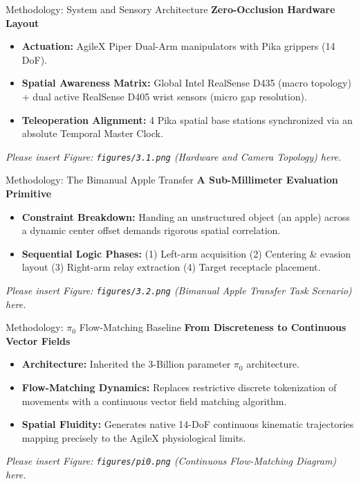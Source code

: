 \documentclass[aspectratio=169, t]{beamer}
\begin{document}
\begin{frame}{Methodology: System and Sensory Architecture}
    {\Large \textbf{Zero-Occlusion Hardware Layout}}
    \vspace{0.5cm}
    \begin{itemize}
        \item \textbf{Actuation:} AgileX Piper Dual-Arm manipulators with Pika grippers (14 DoF). 
        \item \textbf{Spatial Awareness Matrix:} Global Intel RealSense D435 (macro topology) + dual active RealSense D405 wrist sensors (micro gap resolution).
        \item \textbf{Teleoperation Alignment:} 4 Pika spatial base stations synchronized via an absolute Temporal Master Clock.
    \end{itemize}
    \vfill
    \textit{Please insert Figure: \texttt{figures/3.1.png} (Hardware and Camera Topology) here.}
\end{frame}

\begin{frame}{Methodology: The Bimanual Apple Transfer}
    {\Large \textbf{A Sub-Millimeter Evaluation Primitive}}
    \vspace{0.5cm}
    \begin{itemize}
        \item \textbf{Constraint Breakdown:} Handing an unstructured object (an apple) across a dynamic center offset demands rigorous spatial correlation.
        \item \textbf{Sequential Logic Phases:}
              (1) Left-arm acquisition
              (2) Centering \& evasion layout
              (3) Right-arm relay extraction
              (4) Target receptacle placement.
    \end{itemize}
    \vfill
    \textit{Please insert Figure: \texttt{figures/3.2.png} (Bimanual Apple Transfer Task Scenario) here.}
\end{frame}

\begin{frame}{Methodology: $\pi_0$ Flow-Matching Baseline}
    {\Large \textbf{From Discreteness to Continuous Vector Fields}}
    \vspace{0.5cm}
    \begin{itemize}
        \item \textbf{Architecture:} Inherited the 3-Billion parameter $\pi_0$ architecture.
        \item \textbf{Flow-Matching Dynamics:} Replaces restrictive discrete tokenization of movements with a continuous vector field matching algorithm.
        \item \textbf{Spatial Fluidity:} Generates native 14-DoF continuous kinematic trajectories mapping precisely to the AgileX physiological limits.
    \end{itemize}
    \vfill
    \textit{Please insert Figure: \texttt{figures/pi0.png} (Continuous Flow-Matching Diagram) here.}
\end{frame}
\end{document}
